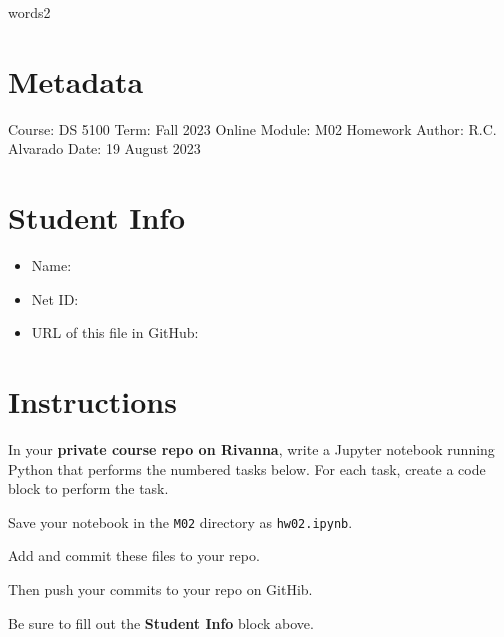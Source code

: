 \documentclass[
  letterpaper,
  DIV=11,
  numbers=noendperiod]{scrreprt}
\newenvironment{Shaded}{\begin{snugshade}}{\end{snugshade}}
\newcommand{\AttributeTok}[1]{\textcolor[rgb]{0.40,0.45,0.13}{#1}}
\newcommand{\FunctionTok}[1]{\textcolor[rgb]{0.28,0.35,0.67}{#1}}
\newcommand{\KeywordTok}[1]{\textcolor[rgb]{0.00,0.23,0.31}{#1}}
\newcommand{\NormalTok}[1]{\textcolor[rgb]{0.00,0.23,0.31}{#1}}
\providecommand{\tightlist}{%
  \setlength{\itemsep}{0pt}\setlength{\parskip}{0pt}}\usepackage{longtable,booktabs,array}
\begin{document}
\begin{Shaded}
\begin{Highlighting}[]
\NormalTok{words2}
\end{Highlighting}
\end{Shaded}

\hypertarget{metadata}{%
\chapter{Metadata}\label{metadata}}

\begin{Shaded}
\begin{Highlighting}[]
\FunctionTok{Course}\KeywordTok{:}\AttributeTok{   DS 5100}
\FunctionTok{Term}\KeywordTok{:}\AttributeTok{     Fall 2023 Online}
\FunctionTok{Module}\KeywordTok{:}\AttributeTok{   M02 Homework}
\FunctionTok{Author}\KeywordTok{:}\AttributeTok{   R.C. Alvarado}
\FunctionTok{Date}\KeywordTok{:}\AttributeTok{     19 August 2023}
\end{Highlighting}
\end{Shaded}

\hypertarget{student-info}{%
\chapter{Student Info}\label{student-info}}

\begin{itemize}
\tightlist
\item
  Name:
\item
  Net ID:
\item
  URL of this file in GitHub:
\end{itemize}

\hypertarget{instructions}{%
\chapter{Instructions}\label{instructions}}

In your \textbf{private course repo on Rivanna}, write a Jupyter
notebook running Python that performs the numbered tasks below. For each
task, create a code block to perform the task.

Save your notebook in the \texttt{M02} directory as \texttt{hw02.ipynb}.

Add and commit these files to your repo.

Then push your commits to your repo on GitHib.

Be sure to fill out the \textbf{Student Info} block above.
\end{document}
